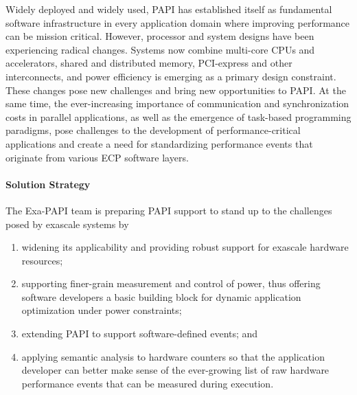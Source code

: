 Widely deployed and widely used, PAPI has established itself as fundamental
software infrastructure in every application domain where improving performance
can be mission critical. 
However, processor and system designs have been experiencing radical changes.
Systems now combine multi-core CPUs and accelerators, shared and
distributed memory, PCI-express and other interconnects, and
power efficiency is emerging as a primary design constraint.
These changes pose new challenges and bring new
opportunities to PAPI. At the same time, the ever-increasing importance of
communication and synchronization costs in parallel applications, as well as the
emergence of task-based programming paradigms, pose
challenges to the development of performance-critical applications and create a
need for standardizing performance events that originate from various ECP
software layers.


\paragraph{Solution Strategy}

The Exa-PAPI team is preparing PAPI support to stand up to 
the challenges posed by exascale systems by 
\begin{enumerate}
\item widening its applicability and providing robust support for exascale 
hardware resources;
\item supporting finer-grain measurement and control of power, thus offering 
software developers a basic building block for dynamic application optimization 
under power constraints; 
\item extending PAPI to support software-defined events; and 
\item applying semantic analysis to hardware counters so that the application 
developer can better make sense of the ever-growing list of raw hardware 
performance events that can be measured during execution. 
\end{enumerate}


